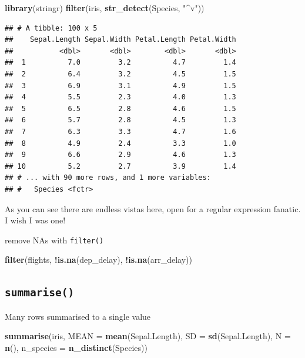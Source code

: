 \documentclass[]{book}
\newenvironment{Shaded}{\begin{snugshade}}{\end{snugshade}}
\newcommand{\KeywordTok}[1]{\textcolor[rgb]{0.13,0.29,0.53}{\textbf{#1}}}
\newcommand{\DataTypeTok}[1]{\textcolor[rgb]{0.13,0.29,0.53}{#1}}
\newcommand{\StringTok}[1]{\textcolor[rgb]{0.31,0.60,0.02}{#1}}
\newcommand{\OperatorTok}[1]{\textcolor[rgb]{0.81,0.36,0.00}{\textbf{#1}}}
\newcommand{\NormalTok}[1]{#1}
\begin{document}
\begin{Shaded}
\begin{Highlighting}[]
\KeywordTok{library}\NormalTok{(stringr)}
\KeywordTok{filter}\NormalTok{(iris, }\KeywordTok{str_detect}\NormalTok{(Species, }\StringTok{"^v"}\NormalTok{)) }
\end{Highlighting}
\end{Shaded}

\begin{verbatim}
## # A tibble: 100 x 5
##    Sepal.Length Sepal.Width Petal.Length Petal.Width
##           <dbl>       <dbl>        <dbl>       <dbl>
##  1          7.0         3.2          4.7         1.4
##  2          6.4         3.2          4.5         1.5
##  3          6.9         3.1          4.9         1.5
##  4          5.5         2.3          4.0         1.3
##  5          6.5         2.8          4.6         1.5
##  6          5.7         2.8          4.5         1.3
##  7          6.3         3.3          4.7         1.6
##  8          4.9         2.4          3.3         1.0
##  9          6.6         2.9          4.6         1.3
## 10          5.2         2.7          3.9         1.4
## # ... with 90 more rows, and 1 more variables:
## #   Species <fctr>
\end{verbatim}

As you can see there are endless vistas here, open for a regular
expression fanatic. I wish I was one!

remove NAs with \texttt{filter()}

\begin{Shaded}
\begin{Highlighting}[]
\KeywordTok{filter}\NormalTok{(flights, }\OperatorTok{!}\KeywordTok{is.na}\NormalTok{(dep_delay), }\OperatorTok{!}\KeywordTok{is.na}\NormalTok{(arr_delay))}
\end{Highlighting}
\end{Shaded}

\subsection{\texorpdfstring{\texttt{summarise()}}{summarise()}}\label{summarise}

Many rows summarised to a single value

\begin{Shaded}
\begin{Highlighting}[]
\KeywordTok{summarise}\NormalTok{(iris, }
          \DataTypeTok{MEAN =} \KeywordTok{mean}\NormalTok{(Sepal.Length), }
          \DataTypeTok{SD =} \KeywordTok{sd}\NormalTok{(Sepal.Length), }
          \DataTypeTok{N =} \KeywordTok{n}\NormalTok{(), }
          \DataTypeTok{n_species =} \KeywordTok{n_distinct}\NormalTok{(Species))}
\end{Highlighting}
\end{Shaded}
\end{document}
